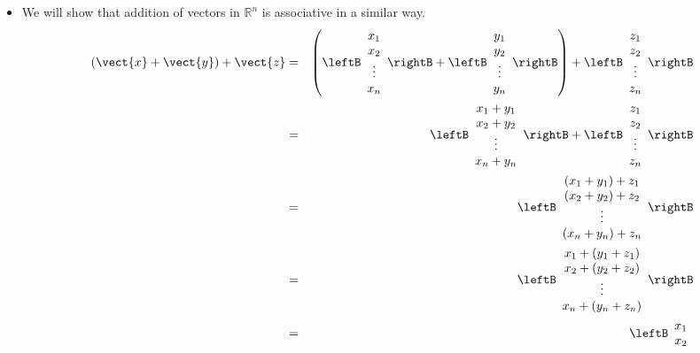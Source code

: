 \begin{solution}
\begin{itemize}
\item 
We will show that addition of vectors in $\mathbb{R}^n$ is associative in a similar way. 
\begin{eqnarray*} 
(\vect{x} + \vect{y}) + \vect{z} &=& 
\left(  \leftB \begin{array}{c}
x_1 \\
x_2 \\
\vdots \\
x_n
\end{array} \rightB +  \leftB \begin{array}{c}
y_1 \\
y_2 \\
\vdots \\
y_n
\end{array} \rightB \right)
+
 \leftB \begin{array}{c}
z_1 \\
z_2 \\
\vdots \\
z_n
\end{array} \rightB \\
&=& 
 \leftB \begin{array}{c}
x_1 + y_1 \\
x_2 + y_2 \\
\vdots \\
x_n + y_n
\end{array} \rightB  + \leftB \begin{array}{c}
z_1 \\
z_2 \\
\vdots \\
z_n
\end{array} \rightB \\
&=& 
\leftB \begin{array}{c}
(x_1 + y_1) + z_1 \\
(x_2 + y_2) + z_2\\
\vdots \\
(x_n + y_n) + z_n
\end{array} \rightB \\
&=& 
\leftB \begin{array}{c}
x_1 + (y_1 + z_1) \\
x_2 + (y_2 + z_2)\\
\vdots \\
x_n + (y_n + z_n)
\end{array} \rightB \\
&=& \leftB \begin{array}{c}
x_1 \\
x_2  \\

\end{array}
\end{eqnarray*}
\end{itemize}
\end{solution}
